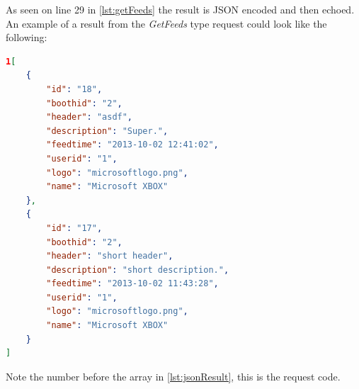 As seen on line 29 in \autoref{lst:getFeeds} the result is JSON encoded and then echoed. An example of a result from the \textit{GetFeeds} type request could look like the following:

\begin{lstlisting}[language=json, label=lst:jsonResult, caption=Example result from a request with type: \textit{GetFeeds}]
1[
    {
        "id": "18",
        "boothid": "2",
        "header": "asdf",
        "description": "Super.",
        "feedtime": "2013-10-02 12:41:02",
        "userid": "1",
        "logo": "microsoftlogo.png",
        "name": "Microsoft XBOX"
    },
    {
        "id": "17",
        "boothid": "2",
        "header": "short header",
        "description": "short description.",
        "feedtime": "2013-10-02 11:43:28",
        "userid": "1",
        "logo": "microsoftlogo.png",
        "name": "Microsoft XBOX"
    }
]
\end{lstlisting}

Note the number before the array in \autoref{lst:jsonResult}, this is the request code.

